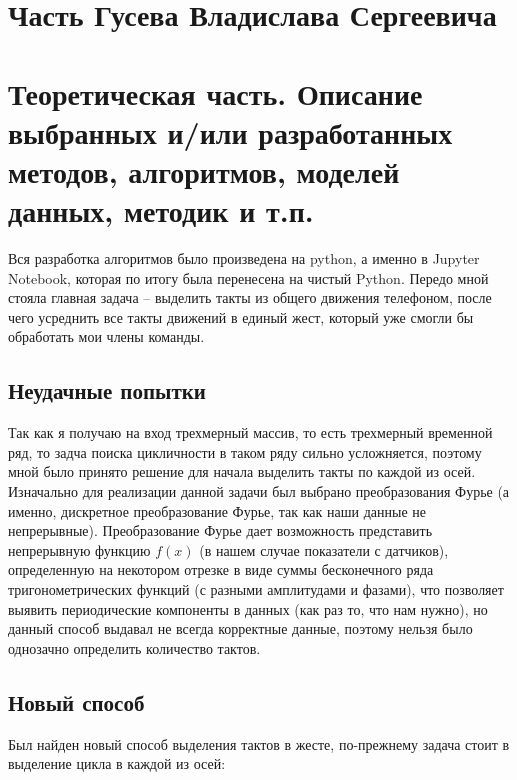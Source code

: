 \documentclass[a4paper]{article}
\begin{document}


\section*{Часть Гусева Владислава Сергеевича}

\section*{Теоретическая часть. Описание выбранных и/или разработанных методов, алгоритмов, моделей данных, методик и т.п.}
Вся разработка алгоритмов было произведена на python, а именно в Jupyter Notebook, которая по итогу была перенесена на чистый Python.
Передо мной стояла главная задача -- выделить такты из общего движения телефоном, после чего усреднить все такты движений в единый жест, который уже смогли бы обработать мои члены команды.

\subsection*{Неудачные попытки}
Так как я получаю на вход трехмерный массив, то есть трехмерный временной ряд, то задча поиска цикличности в таком ряду сильно усложняется, поэтому мной было принято решение для начала выделить такты по каждой из осей. Изначально для реализации данной задачи был выбрано преобразования Фурье (а именно, дискретное преобразование Фурье, так как наши данные не непрерывные). Преобразование Фурье
дает возможность представить непрерывную функцию $f(x)$ (в нашем случае показатели с датчиков), определенную на некотором отрезке в виде суммы бесконечного ряда тригонометрических функций (с разными амплитудами и фазами), что позволяет выявить периодические компоненты в данных (как раз то, что нам нужно), но данный способ выдавал не всегда корректные данные, поэтому нельзя было однозачно определить количество тактов.

\subsection*{Новый способ}
Был найден новый способ выделения тактов в жесте, по-прежнему задача стоит в выделение цикла в каждой из осей:
\end{document}
